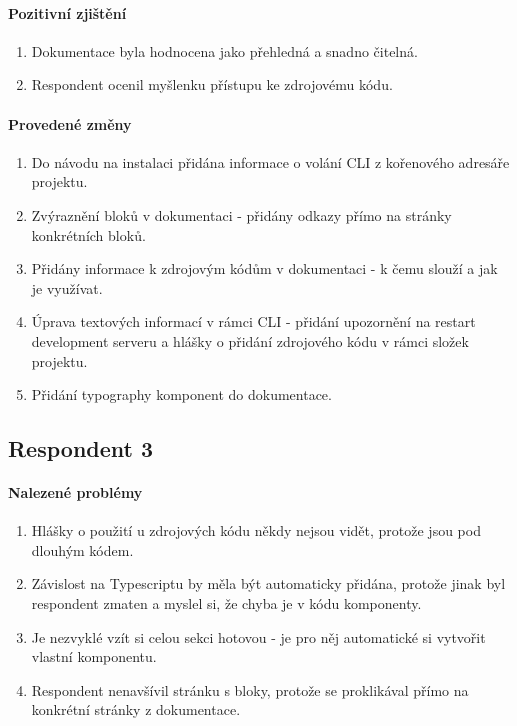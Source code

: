 \paragraph{Pozitivní zjištění}
\begin{enumerate}
  \item Dokumentace byla hodnocena jako přehledná a snadno čitelná.
  \item Respondent ocenil myšlenku přístupu ke zdrojovému kódu.
\end{enumerate}

\paragraph{Provedené změny}
\begin{enumerate}
  \item Do návodu na instalaci přidána informace o volání CLI z kořenového adresáře projektu.
  \item Zvýraznění bloků v dokumentaci - přidány odkazy přímo na stránky konkrétních bloků.
  \item Přidány informace k zdrojovým kódům v dokumentaci - k čemu slouží a jak je využívat.
  \item Úprava textových informací v rámci CLI - přidání upozornění na restart development serveru a hlášky o přidání zdrojového kódu v rámci složek projektu.
  \item Přidání typography komponent do dokumentace.
\end{enumerate}


\subsection{Respondent 3}

\paragraph{Nalezené problémy}
\begin{enumerate}
  \item Hlášky o použití u zdrojových kódu někdy nejsou vidět, protože jsou pod dlouhým kódem.
  \item Závislost na Typescriptu by měla být automaticky přidána, protože jinak byl respondent zmaten a myslel si, že chyba je v kódu komponenty.
  \item Je nezvyklé vzít si celou sekci hotovou - je pro něj automatické si vytvořit vlastní komponentu.
  \item Respondent nenavšívil stránku s bloky, protože se proklikával přímo na konkrétní stránky z dokumentace.
\end{enumerate}

